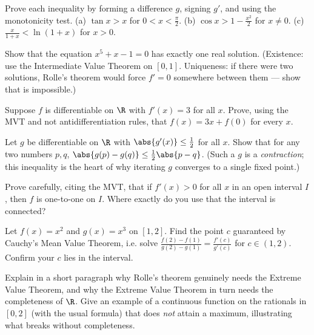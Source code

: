 \begin{exercise}
Prove each inequality by forming a difference $g$, signing $g'$, and using the
monotonicity test.
(a) $\tan x > x$ for $0<x<\frac\pi2$.\quad
(b) $\cos x > 1-\frac{x^2}{2}$ for $x\ne 0$.\quad
(c) $\frac{x}{1+x}<\ln(1+x)$ for $x>0$.
\end{exercise}

\begin{exercise}
Show that the equation $x^5+x-1=0$ has exactly one real solution. (Existence: use
the Intermediate Value Theorem on $[0,1]$. Uniqueness: if there were two solutions,
Rolle's theorem would force $f'=0$ somewhere between them --- show that is
impossible.)
\end{exercise}

\begin{exercise}
Suppose $f$ is differentiable on $\R$ with $f'(x)=3$ for all $x$. Prove, using the
MVT and not antidifferentiation rules, that $f(x)=3x+f(0)$ for every $x$.
\end{exercise}

\begin{exercise}
Let $g$ be differentiable on $\R$ with $\abs{g'(x)}\le \tfrac12$ for all $x$. Show
that for any two numbers $p,q$, $\abs{g(p)-g(q)}\le \tfrac12\abs{p-q}$. (Such a $g$
is a \emph{contraction}; this inequality is the heart of why iterating $g$ converges
to a single fixed point.)
\end{exercise}

\begin{exercise}
Prove carefully, citing the MVT, that if $f'(x)>0$ for all $x$ in an open interval
$I$, then $f$ is one-to-one on $I$. Where exactly do you use that the interval is
connected?
\end{exercise}

\begin{exercise}
Let $f(x)=x^2$ and $g(x)=x^3$ on $[1,2]$. Find the point $c$ guaranteed by Cauchy's
Mean Value Theorem, i.e. solve $\frac{f(2)-f(1)}{g(2)-g(1)}=\frac{f'(c)}{g'(c)}$ for
$c\in(1,2)$. Confirm your $c$ lies in the interval.
\end{exercise}

\begin{exercise}
Explain in a short paragraph why Rolle's theorem genuinely needs the Extreme Value
Theorem, and why the Extreme Value Theorem in turn needs the completeness of $\R$.
Give an example of a continuous function on the rationals in $[0,2]$ (with the usual
formula) that does \emph{not} attain a maximum, illustrating what breaks without
completeness.
\end{exercise}
